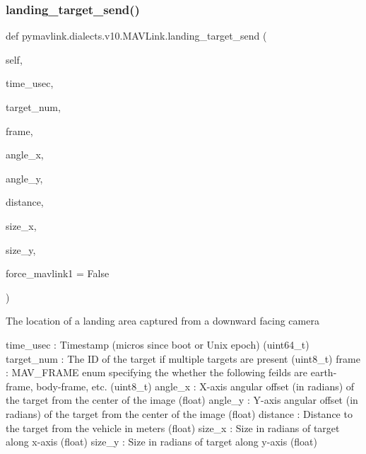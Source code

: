 \begin{DoxyVerb}
\begin{DoxyVerb}
\begin{DoxyVerb}
\begin{DoxyVerb}
\subsubsection{\texorpdfstring{landing\+\_\+target\+\_\+send()}{landing\_target\_send()}}
{\footnotesize\ttfamily def pymavlink.\+dialects.\+v10.\+M\+A\+V\+Link.\+landing\+\_\+target\+\_\+send (\begin{DoxyParamCaption}\item[{}]{self,  }\item[{}]{time\+\_\+usec,  }\item[{}]{target\+\_\+num,  }\item[{}]{frame,  }\item[{}]{angle\+\_\+x,  }\item[{}]{angle\+\_\+y,  }\item[{}]{distance,  }\item[{}]{size\+\_\+x,  }\item[{}]{size\+\_\+y,  }\item[{}]{force\+\_\+mavlink1 = {\ttfamily False} }\end{DoxyParamCaption})}

\begin{DoxyVerb}The location of a landing area captured from a downward facing camera

time_usec                 : Timestamp (micros since boot or Unix epoch) (uint64_t)
target_num                : The ID of the target if multiple targets are present (uint8_t)
frame                     : MAV_FRAME enum specifying the whether the following feilds are earth-frame, body-frame, etc. (uint8_t)
angle_x                   : X-axis angular offset (in radians) of the target from the center of the image (float)
angle_y                   : Y-axis angular offset (in radians) of the target from the center of the image (float)
distance                  : Distance to the target from the vehicle in meters (float)
size_x                    : Size in radians of target along x-axis (float)
size_y                    : Size in radians of target along y-axis (float)\end{DoxyVerb}
 \mbox{\label{classpymavlink_1_1dialects_1_1v10_1_1MAVLink_a9e85805885773cc313980301fca85957}} 

\end{DoxyVerb}
\end{DoxyVerb}
\end{DoxyVerb}
\end{DoxyVerb}
